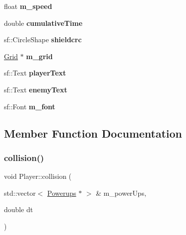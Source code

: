 \begin{DoxyCompactItemize}
\mbox{\label{class_player_ac872b310930295033b218f1551a27e34}} 
float {\bfseries m\+\_\+speed}
\item 
\mbox{\label{class_player_a7158b013eca5fd46648a91f99d4e5473}} 
double {\bfseries cumulative\+Time}
\item 
\mbox{\label{class_player_a8acc499bd0a906777b0e5e22898b41a8}} 
sf\+::\+Circle\+Shape {\bfseries shieldcrc}
\item 
\mbox{\label{class_player_a611fcd438eeda1226d5522408430c0f7}} 
\mbox{\hyperlink{class_grid}{Grid}} $\ast$ {\bfseries m\+\_\+grid}
\item 
\mbox{\label{class_player_ae22f41c415f73ca8703a55beb34682b1}} 
sf\+::\+Text {\bfseries player\+Text}
\item 
\mbox{\label{class_player_a41be577569fc82dda91cdf2c3a56d636}} 
sf\+::\+Text {\bfseries enemy\+Text}
\item 
\mbox{\label{class_player_a3b6b2902f7755600b8a784928ecd1ae7}} 
sf\+::\+Font {\bfseries m\+\_\+font}
\end{DoxyCompactItemize}


\subsection{Member Function Documentation}
\mbox{\label{class_player_a220b112385e59f3218c98a2e7842236d}} 
\subsubsection{\texorpdfstring{collision()}{collision()}}
{\footnotesize\ttfamily void Player\+::collision (\begin{DoxyParamCaption}\item[{std\+::vector$<$ \mbox{\hyperlink{class_powerups}{Powerups}} $\ast$ $>$ \&}]{m\+\_\+power\+Ups,  }\item[{double}]{dt }\end{DoxyParamCaption})}



